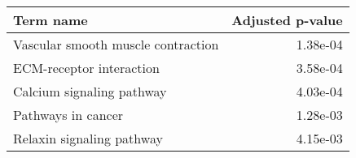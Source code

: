 \begin{tabular}{lr}
\toprule
                          Term name &  Adjusted p-value \\
\midrule
 Vascular smooth muscle contraction &          1.38e-04 \\
           ECM-receptor interaction &          3.58e-04 \\
          Calcium signaling pathway &          4.03e-04 \\
                 Pathways in cancer &          1.28e-03 \\
          Relaxin signaling pathway &          4.15e-03 \\
\bottomrule
\end{tabular}
